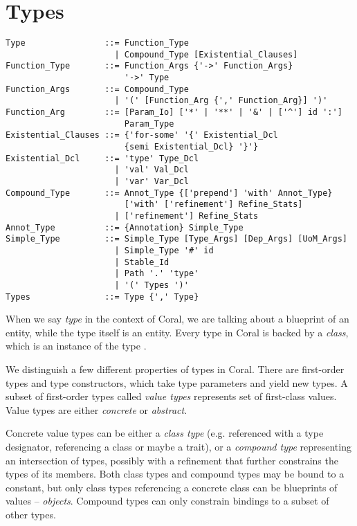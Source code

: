
\chapter{Types}

\syntax\begin{lstlisting}
Type                ::= Function_Type
                      | Compound_Type [Existential_Clauses]
Function_Type       ::= Function_Args {'->' Function_Args} 
                        '->' Type
Function_Args       ::= Compound_Type
                      | '(' [Function_Arg {',' Function_Arg}] ')'
Function_Arg        ::= [Param_Io] ['*' | '**' | '&' | ['^'] id ':'] 
                        Param_Type
Existential_Clauses ::= {'for-some' '{' Existential_Dcl
                        {semi Existential_Dcl} '}'}
Existential_Dcl     ::= 'type' Type_Dcl
                      | 'val' Val_Dcl
                      | 'var' Var_Dcl
Compound_Type       ::= Annot_Type {['prepend'] 'with' Annot_Type} 
                        ['with' ['refinement'] Refine_Stats]
                      | ['refinement'] Refine_Stats
Annot_Type          ::= {Annotation} Simple_Type
Simple_Type         ::= Simple_Type [Type_Args] [Dep_Args] [UoM_Args]
                      | Simple_Type '#' id
                      | Stable_Id
                      | Path '.' 'type'
                      | '(' Types ')'
Types               ::= Type {',' Type}
\end{lstlisting}

When we say \textit{type} in the context of Coral, we are talking about a blueprint of an entity, while the type itself is an entity. Every type in Coral is backed by a \textit{class}, which is an instance of the type \lstinline@Class@. 

We distinguish a few different properties of types in Coral. There are first-order types and type constructors, which take type parameters and yield new types. A subset of first-order types called \textit{value types} represents set of first-class values. Value types are either \textit{concrete} or \textit{abstract}. 

Concrete value types can be either a \textit{class type} (e.g. referenced with a type designator, referencing a class or maybe a trait), or a \textit{compound type} representing an intersection of types, possibly with a refinement that further constrains the types of its members. Both class types and compound types may be bound to a constant, but only class types referencing a concrete class can be blueprints of values -- \textit{objects}. Compound types can only constrain bindings to a subset of other types. 

